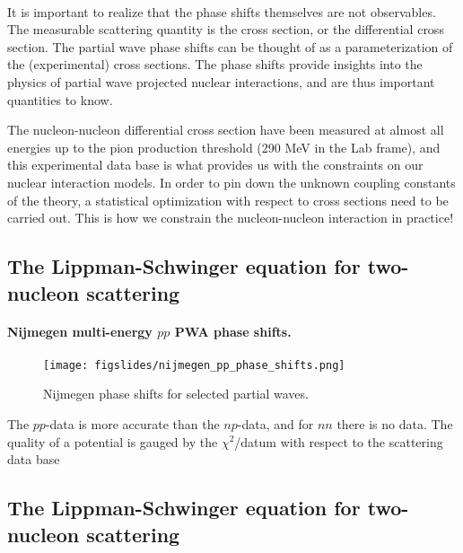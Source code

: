 \documentclass[%
twoside,                 %
final,                   %
10pt]{article}
\begin{document}
\paragraph{}
It is important to realize that the phase shifts themselves are not
observables. The measurable scattering quantity is the cross section,
or the differential cross section. The partial wave phase shifts can
be thought of as a parameterization of the (experimental) cross
sections. The phase shifts provide insights into the physics of
partial wave projected nuclear interactions, and are thus important
quantities to know.

The nucleon-nucleon differential cross section
have been measured at almost all energies up to the pion production
threshold (290 MeV in the Lab frame), and this experimental data base
is what provides us with the constraints on our nuclear interaction
models. In order to pin down the unknown coupling constants of the
theory, a statistical optimization with respect to cross sections need
to be carried out. This is how we constrain the nucleon-nucleon
interaction in practice!



\subsection*{The Lippman-Schwinger equation for two-nucleon scattering}

\paragraph{Nijmegen multi-energy $pp$ PWA phase shifts.}


\begin{figure}[ht]
  \centerline{\texttt{[image: figslides/nijmegen\_pp\_phase\_shifts.png]}}
  \caption{
  Nijmegen phase shifts for selected partial waves.
  }
\end{figure}


The $pp$-data is more accurate than the $np$-data, and for $nn$ there is no data. The quality of a potential is gauged by the $\chi^2$/datum with respect to the scattering data base



\subsection*{The Lippman-Schwinger equation for two-nucleon scattering}
\end{document}
